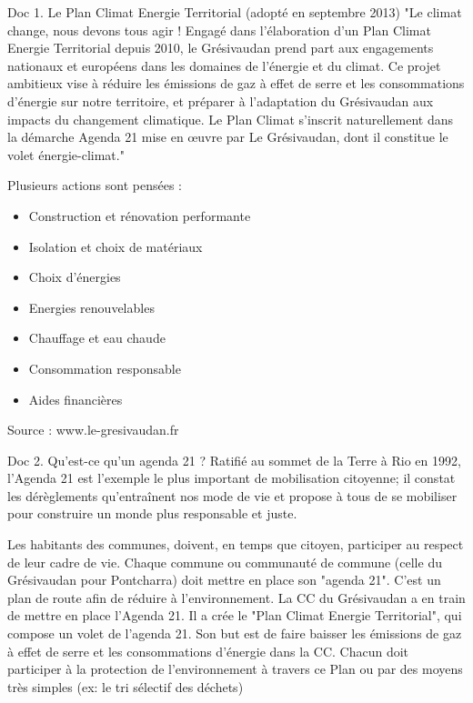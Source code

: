 \documentclass{beamer}
\begin{document}
\begin{frame}
\begin{beamerboxesrounded}[scheme=blocimage]{Doc 1. Le Plan Climat Energie Territorial (adopté en septembre 2013)} 
"Le climat change, nous devons tous agir ! Engagé dans l’élaboration d’un Plan Climat Energie Territorial depuis 2010, le Grésivaudan prend part aux engagements nationaux et européens dans les domaines de l’énergie et du climat. Ce projet ambitieux vise à réduire les émissions de gaz à effet de serre et les consommations d’énergie sur notre territoire, et préparer à l’adaptation du Grésivaudan aux impacts du changement climatique. Le Plan Climat s’inscrit naturellement dans la démarche Agenda 21 mise en œuvre par Le Grésivaudan, dont il constitue le volet énergie-climat."

Plusieurs actions sont pensées : 
\begin{itemize}
\item Construction et rénovation performante
\item Isolation et choix de matériaux
\item Choix d'énergies
\item Energies renouvelables
\item Chauffage et eau chaude
\item Consommation responsable
\item Aides financières
\end{itemize}

\begin{flushright}
Source : www.le-gresivaudan.fr
\end{flushright}
\end{beamerboxesrounded}
\end{frame}

\begin{frame}
\begin{beamerboxesrounded}[scheme=blocimage]{Doc 2. Qu'est-ce qu'un agenda 21 ?} 
Ratifié au sommet de la Terre à Rio en 1992, l'Agenda 21 est l'exemple le plus important de mobilisation citoyenne; il constat les dérèglements qu'entraînent nos mode de vie et propose à tous de se mobiliser pour construire un monde plus responsable et juste.
\end{beamerboxesrounded}
\end{frame}

\begin{frame}
Les habitants des communes, doivent, en temps que citoyen, participer au respect de leur cadre de vie. Chaque commune ou communauté de commune (celle du Grésivaudan pour Pontcharra) doit mettre en place son "agenda 21". C'est un plan de route afin de réduire à l'environnement. La CC du Grésivaudan a en train de mettre en place l'Agenda 21. Il a crée le "Plan Climat Energie Territorial", qui compose un volet de l'agenda 21. Son but est de faire baisser les émissions de gaz à effet de serre et les consommations d'énergie dans la CC. 
Chacun doit participer à la protection de l'environnement à travers ce Plan ou par des moyens très simples (ex: le tri sélectif des déchets)
\end{frame}


  
\end{document}
